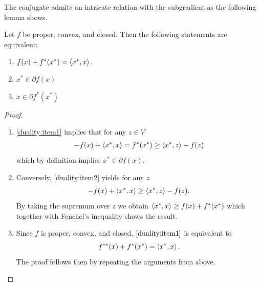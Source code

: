 The conjugate admits an intricate relation with the subgradient as the following lemma shows.
\begin{lemma}\label{duality:lemma:subdiff_conjugate}
    Let $f$ be proper, convex, and closed. Then the following statements are equivalent:
    \begin{enumerate}
        \item $f(x) + f^*(x^*) = \left\langle x^* , x\right\rangle$.\label{duality:item1}
        \item $x^*\in \partial f(x)$\label{duality:item2}
        \item $x\in \partial f^*(x^*)$\label{duality:item3}
    \end{enumerate}
\end{lemma}
\begin{proof}\
    \begin{enumerate}
        \item[\ref{duality:item1}$\rightarrow$\ref{duality:item2}:] \ref{duality:item1} implies that for any $z\in V$
        \begin{equation}
            \begin{aligned}
                -f(x) + \left\langle x^* , x\right\rangle = f^*(x^*) \geq \left\langle x^* , z\right\rangle - f(z)
            \end{aligned}
        \end{equation}
        which by definition implies $x^*\in \partial f(x)$.
        \item[\ref{duality:item2}$\rightarrow$\ref{duality:item1}:]
        Conversely, \ref{duality:item2} yields for any $z$
        \begin{equation}
            \begin{aligned}
                -f(x) + \left\langle x^* , x\right\rangle \geq \left\langle x^* , z\right\rangle - f(z).
            \end{aligned}
        \end{equation}
        By taking the supremum over $z$ we obtain $\left\langle x^* , x\right\rangle \geq f(x) + f^*(x^*)$ which together with Fenchel's inequality shows the result.
        \item[\ref{duality:item1}$\leftrightarrow$\ref{duality:item3}:]
        Since $f$ is proper, convex, and closed, $\ref{duality:item1}$ is equivalent to
        \begin{equation}
            f^{**}(x) + f^*(x^*) = \left\langle x^* , x\right\rangle.
        \end{equation}
        The proof follows then by repeating the arguments from above.
    \end{enumerate}
\end{proof}

